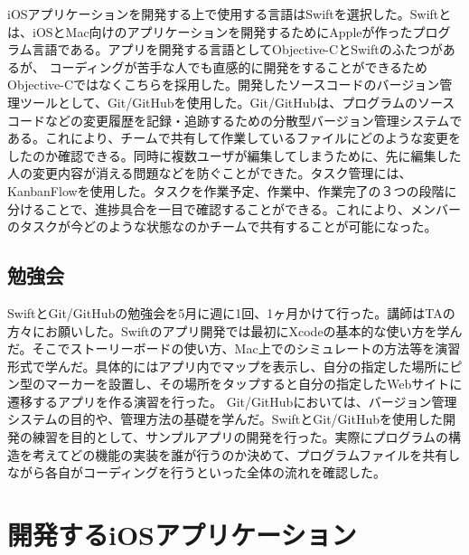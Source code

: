 \documentclass[openany,11pt,papersize]{jsbook}
\begin{document}
iOSアプリケーションを開発する上で使用する言語はSwiftを選択した。Swiftとは、iOSとMac向けのアプリケーションを開発するためにAppleが作ったプログラム言語である。アプリを開発する言語としてObjective-CとSwiftのふたつがあるが、
コーディングが苦手な人でも直感的に開発をすることができるためObjective-Cではなくこちらを採用した。開発したソースコードのバージョン管理ツールとして、Git/GitHubを使用した。Git/GitHubは、プログラムのソースコードなどの変更履歴を記録・追跡するための分散型バージョン管理システムである。これにより、チームで共有して作業しているファイルにどのような変更をしたのか確認できる。同時に複数ユーザが編集してしまうために、先に編集した人の変更内容が消える問題などを防ぐことができた。タスク管理には、KanbanFlowを使用した。タスクを作業予定、作業中、作業完了の３つの段階に分けることで、進捗具合を一目で確認することができる。これにより、メンバーのタスクが今どのような状態なのかチームで共有することが可能になった。

\section{勉強会}
SwiftとGit/GitHubの勉強会を5月に週に1回、1ヶ月かけて行った。講師はTAの方々にお願いした。Swiftのアプリ開発では最初にXcodeの基本的な使い方を学んだ。そこでストーリーボードの使い方、Mac上でのシミュレートの方法等を演習形式で学んだ。具体的にはアプリ内でマップを表示し、自分の指定した場所にピン型のマーカーを設置し、その場所をタップすると自分の指定したWebサイトに遷移するアプリを作る演習を行った。
Git/GitHubにおいては、バージョン管理システムの目的や、管理方法の基礎を学んだ。SwiftとGit/GitHubを使用した開発の練習を目的として、サンプルアプリの開発を行った。実際にプログラムの構造を考えてどの機能の実装を誰が行うのか決めて、プログラムファイルを共有しながら各自がコーディングを行うといった全体の流れを確認した。



\chapter{開発するiOSアプリケーション}
\end{document}
